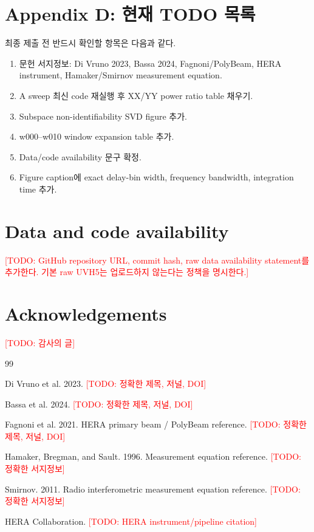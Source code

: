 \documentclass[11pt,a4paper]{article}
\newcommand{\todo}[1]{\textcolor{red}{[TODO: #1]}}
\begin{document}
\section{Appendix D: 현재 TODO 목록}

최종 제출 전 반드시 확인할 항목은 다음과 같다.
\begin{enumerate}
  \item 문헌 서지정보: Di Vruno 2023, Bassa 2024, Fagnoni/PolyBeam, HERA instrument, Hamaker/Smirnov measurement equation.
  \item A sweep 최신 code 재실행 후 XX/YY power ratio table 채우기.
  \item Subspace non-identifiability SVD figure 추가.
  \item w000--w010 window expansion table 추가.
  \item Data/code availability 문구 확정.
  \item Figure caption에 exact delay-bin width, frequency bandwidth, integration time 추가.
\end{enumerate}

\section*{Data and code availability}

\todo{GitHub repository URL, commit hash, raw data availability statement를 추가한다. 기본 raw UVH5는 업로드하지 않는다는 정책을 명시한다.}

\section*{Acknowledgements}

\todo{감사의 글}

\begin{thebibliography}{99}

Di Vruno et al. 2023.
\newblock \todo{정확한 제목, 저널, DOI}

Bassa et al. 2024.
\newblock \todo{정확한 제목, 저널, DOI}

Fagnoni et al. 2021.
\newblock HERA primary beam / PolyBeam reference.
\newblock \todo{정확한 제목, 저널, DOI}

Hamaker, Bregman, and Sault. 1996.
\newblock Measurement equation reference.
\newblock \todo{정확한 서지정보}

Smirnov. 2011.
\newblock Radio interferometric measurement equation reference.
\newblock \todo{정확한 서지정보}

HERA Collaboration.
\newblock \todo{HERA instrument/pipeline citation}

\end{thebibliography}
\end{document}
